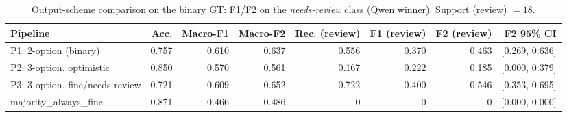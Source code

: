 \begin{table}[htbp]
  \centering
  \caption{Output-scheme comparison on the binary GT: F1/F2 on the \emph{needs-review} class (Qwen winner). Support (review) $=18$.}
  \label{tab:f2-pipeline}
  \begin{tabular}{lrrrrrrr}
    \toprule
    Pipeline & Acc. & Macro-F1 & Macro-F2 & Rec. (review) & F1 (review) & F2 (review) & F2 95\% CI \\
    \midrule
    P1: 2-option (binary) & 0.757 & 0.610 & 0.637 & 0.556 & 0.370 & 0.463 & [0.269, 0.636] \\
    P2: 3-option, optimistic & 0.850 & 0.570 & 0.561 & 0.167 & 0.222 & 0.185 & [0.000, 0.379] \\
    P3: 3-option, fine/needs-review & 0.721 & 0.609 & 0.652 & 0.722 & 0.400 & 0.546 & [0.353, 0.695] \\
    majority\_always\_fine & 0.871 & 0.466 & 0.486 & 0 & 0 & 0 & [0.000, 0.000] \\
    \bottomrule
  \end{tabular}
\end{table}
